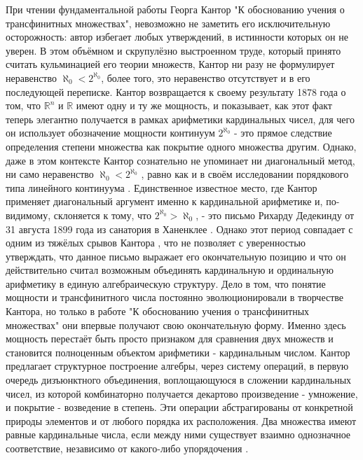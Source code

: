 \documentclass[12pt]{article}
\begin{document}
При чтении фундаментальной работы Георга Кантор "К обоснованию учения о трансфинитных множествах", невозможно не заметить его исключительную осторожность: автор избегает любых утверждений, в истинности которых он не уверен. В этом объёмном и скрупулёзно выстроенном труде, который принято считать кульминацией его теории множеств, Кантор ни разу не формулирует неравенство $\aleph_0 < 2^{\aleph_0}$, более того, это неравенство отсутствует и в его последующей переписке. Кантор возвращается к своему результату 1878 года о том, что $\mathbb{R}^n$ и $\mathbb{R}$ имеют одну и ту же мощность, и показывает, как этот факт теперь элегантно получается в рамках арифметики кардинальных чисел, для чего он использует обозначение мощности континуум $2^{\aleph_0}$ - это прямое следствие определения степени множества как покрытие одного множества другим. Однако, даже в этом контексте Кантор сознательно не упоминает ни диагональный метод, ни само неравенство $\aleph_0 < 2^{\aleph_0}$ \cite{cantor-continuum-cardinality}, равно как и в своём исследовании порядкового типа линейного континуума \cite{cantor-continuum-order}. Единственное известное место, где Кантор применяет диагональный аргумент именно к кардинальной арифметике и, по-видимому, склоняется к тому, что $2^{\aleph_0} > \aleph_0$, - это письмо Рихарду Дедекинду от 31 августа 1899 года из санатория в Ханенклее \cite{cantor-strange-letter}. Однако этот период совпадает с одним из тяжёлых срывов Кантора \cite{dauben-cantor-1899, grattan-guinness-1899}, что не позволяет с уверенностью утверждать, что данное письмо выражает его окончательную позицию и что он действительно считал возможным объединять кардинальную и ординальную арифметику в единую алгебраическую структуру. Дело в том, что понятие мощности и трансфинитного числа постоянно эволюционировали в творчестве Кантора, но только в работе "К обоснованию учения о трансфинитных множествах" они впервые получают свою окончательную форму. Именно здесь мощность перестаёт быть просто признаком для сравнения двух множеств и становится полноценным объектом арифметики - кардинальным числом. Кантор предлагает структурное построение алгебры, через систему операций, в первую очередь дизъюнктного объединения, воплощающуюся в сложении кардинальных чисел, из которой комбинаторно получается декартово произведение - умножение, и покрытие - возведение в степень. Эти операции абстрагированы от конкретной природы элементов и от любого порядка их расположения. Два множества имеют равные кардинальные числа, если между ними существует взаимно однозначное соответствие, независимо от какого-либо упорядочения \cite{cantor-cardinal}. 
\end{document}
